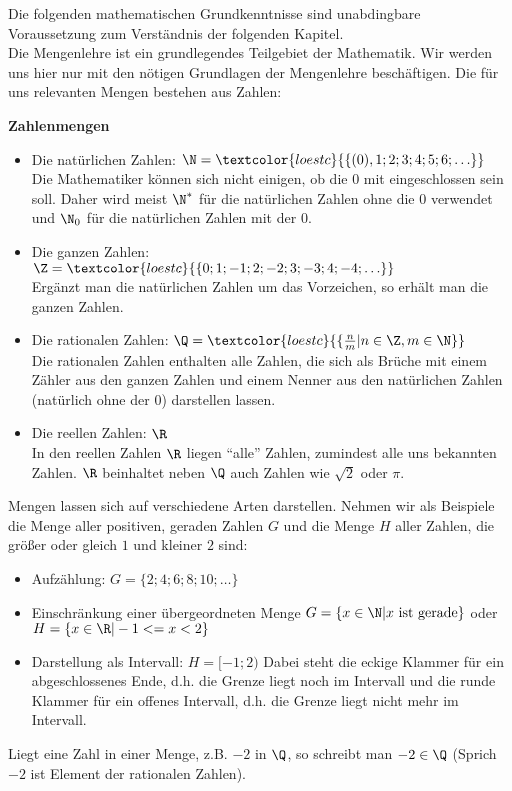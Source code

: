 Die folgenden mathematischen Grundkenntnisse sind unabdingbare Voraussetzung zum Verständnis der folgenden Kapitel.\\
Die Mengenlehre ist ein grundlegendes Teilgebiet der Mathematik. Wir werden uns hier nur mit den nötigen Grundlagen der Mengenlehre beschäftigen. Die für uns relevanten Mengen bestehen aus Zahlen:
\begin{tcolorbox}
	\textbf{Zahlenmengen}
	\begin{itemize}
		\item Die natürlichen Zahlen: \({\N=\textcolor{loestc}{\{(0), 1; 2; 3; 4; 5; 6; \ldots\}}}\)\\Die Mathematiker können sich nicht einigen, ob die 0 mit eingeschlossen sein soll. Daher wird meist $\N^*$ für die natürlichen Zahlen ohne die 0 verwendet und \(\N_0\) für die natürlichen Zahlen mit der 0.
		\item Die ganzen Zahlen: \({\Z=\textcolor{loestc}{\{0; 1; -1; 2; -2; 3; -3; 4; -4;\ldots\}}}\)\\Ergänzt man die natürlichen Zahlen um das Vorzeichen, so erhält man die ganzen Zahlen.
		\item Die rationalen Zahlen: \({\Q=\textcolor{loestc}{\{\frac{n}{m}|n\in\Z, m\in\N\}}}\)\\Die rationalen Zahlen enthalten alle Zahlen, die sich als Brüche mit einem Zähler aus den ganzen Zahlen und einem Nenner aus den natürlichen Zahlen (natürlich ohne der 0) darstellen lassen.
		\item Die reellen Zahlen: \(\R\)\\In den reellen Zahlen \(\R\) liegen "`alle"' Zahlen, zumindest alle uns bekannten Zahlen. \(\R\) beinhaltet neben \(\Q\) auch Zahlen wie \(\sqrt{2}\) oder \(\pi\).
	\end{itemize}
\end{tcolorbox}
Mengen lassen sich auf verschiedene Arten darstellen. Nehmen wir als Beispiele die Menge aller positiven, geraden Zahlen $G$ und die Menge $H$ aller Zahlen, die größer oder gleich $1$ und kleiner $2$ sind:
\begin{itemize}
	\item Aufzählung: ${G=\{2; 4; 6; 8; 10;\ldots \}}$
	\item Einschränkung einer übergeordneten Menge ${G=\{x\in\N|x\text{ ist gerade}\}}$ oder\linebreak ${H=\{x\in\R|-1<=x<2\}}$
	\item Darstellung als Intervall: $H=[-1;2)$ Dabei steht die eckige Klammer für ein abgeschlossenes Ende, d.h. die Grenze liegt noch im Intervall und die runde Klammer für ein offenes Intervall, d.h. die Grenze liegt nicht mehr im Intervall.
\end{itemize}
Liegt eine Zahl in einer Menge, z.B. $-2$ in $\Q$, so schreibt man ${-2\in\Q}$ (Sprich $-2$ ist Element der rationalen Zahlen).